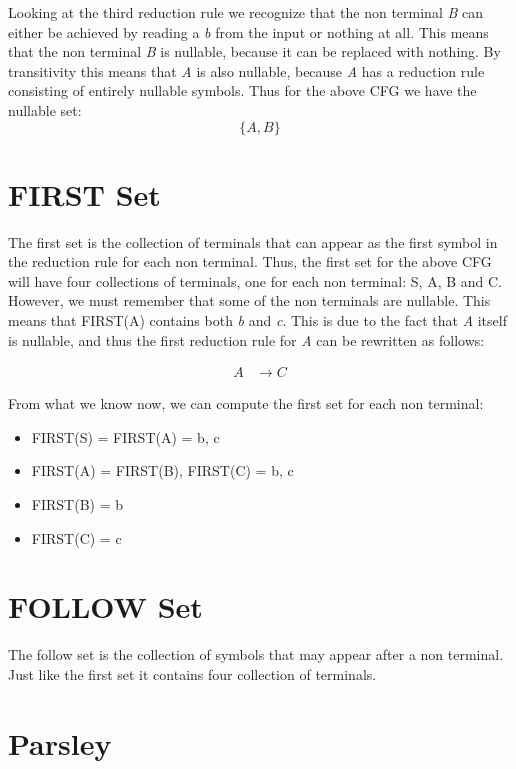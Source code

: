Looking at the third reduction rule we recognize that the non terminal \textit{B} can either be achieved by reading a \textit{b} from the input or nothing at all. This means that the non terminal \textit{B} is nullable, because it can be replaced with nothing. By transitivity this means that \textit{A} is also nullable, because \textit{A} has a reduction rule consisting of entirely nullable symbols. Thus for the above CFG we have the nullable set:
\[\{A, B\}\]

\section{FIRST Set}

The first set is the collection of terminals that can appear as the first symbol in the reduction rule for each non terminal. Thus, the first set for the above CFG will have four collections of terminals, one for each non terminal: S, A, B and C. However, we must remember that some of the non terminals are nullable. This means that FIRST(A) contains both \textit{b} and \textit{c}. This is due to the fact that \textit{A} itself is nullable, and thus the first reduction rule for \textit{A} can be rewritten as follows:


\begin{equation*}
  \begin{split}
      A &\rightarrow C
  \end{split}
\end{equation*}

From what we know now, we can compute the first set for each non terminal:
\begin{itemize}
  \item FIRST(S) = {FIRST(A)} = {b, c}
  \item FIRST(A) = {FIRST(B), FIRST(C)} = {b, c}
  \item FIRST(B) = {b}
  \item FIRST(C) = {c}
\end{itemize}

\section{FOLLOW Set}

The follow set is the collection of symbols that may appear after a non terminal. Just like the first set it contains four collection of terminals.

\section{Parsley}

